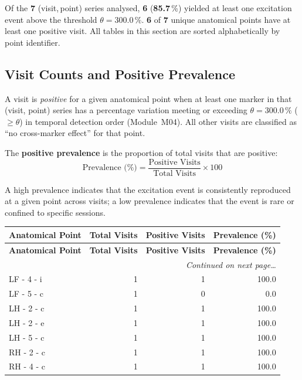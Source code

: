 \documentclass[a4paper,11pt]{article}
\begin{document}
\noindent
Of the \textbf{7} (visit,\,point) series analysed,
\textbf{6} (\textbf{85.7}\,\%) yielded at least one
excitation event above the threshold $\theta = 300.0\,\%$.
\textbf{6} of \textbf{7} unique anatomical points
have at least one positive visit.
All tables in this section are sorted alphabetically by point identifier.

\subsection{Visit Counts and Positive Prevalence}

A visit is \emph{positive} for a given anatomical point when at least one marker in that
(visit, point) series has a percentage variation meeting or exceeding
$\theta = 300.0\,\%$ ($\geq \theta$) in temporal detection order (Module~M04).
All other visits are classified as ``no cross-marker effect'' for that point.

The \textbf{positive prevalence} is the proportion of total visits that are positive:
\[
  \text{Prevalence (\%)} = \frac{\text{Positive Visits}}{\text{Total Visits}} \times 100
\]

A high prevalence indicates that the excitation event is consistently reproduced at a given
point across visits; a low prevalence indicates that the event is rare or confined to
specific sessions.

\begin{small}
\begin{longtable}{p{5cm}rrr}
\toprule
\textbf{Anatomical Point} &
\textbf{Total Visits} &
\textbf{Positive Visits} &
\textbf{Prevalence (\%)} \\
\midrule
\endfirsthead
\toprule
\textbf{Anatomical Point} &
\textbf{Total Visits} &
\textbf{Positive Visits} &
\textbf{Prevalence (\%)} \\
\midrule
\endhead
\midrule
\multicolumn{4}{r}{\small\emph{Continued on next page\ldots}} \\
\endfoot
\bottomrule
\endlastfoot
LF - 4 - i & 1 & 1 & 100.0 \\
LF - 5 - c & 1 & 0 & 0.0 \\
LH - 2 - c & 1 & 1 & 100.0 \\
LH - 2 - e & 1 & 1 & 100.0 \\
LH - 5 - c & 1 & 1 & 100.0 \\
RH - 2 - c & 1 & 1 & 100.0 \\
RH - 4 - c & 1 & 1 & 100.0 \\
\end{longtable}
\end{small}
\end{document}
